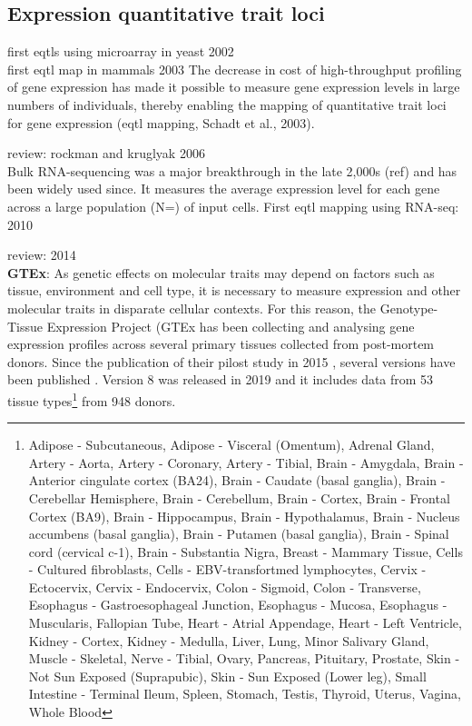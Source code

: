 \newpage

\subsection{Expression quantitative trait loci}\label{sec:eqtl}

first \glspl{eqtl} using microarray in yeast 2002 \cite{brem2002genetic}\\

first \gls{eqtl} map in mammals 2003
The decrease in cost of high-throughput profiling of gene expression has made it possible to measure gene expression levels in large numbers of individuals, thereby enabling the mapping of quantitative trait loci for gene expression (\gls{eqtl} mapping, Schadt et al., 2003). \cite{schadt2003genetics}

review: rockman and kruglyak 2006 \cite{rockman2006genetics}\\

Bulk RNA-sequencing was a major breakthrough in the late 2,000s (ref) and has been widely used since.
It measures the average expression level for each gene across a large population (N=) of input cells. 
First \gls{eqtl} mapping using RNA-seq: 2010
\cite{montgomery2010transcriptome, pickrell2010understanding}

review: 2014 \cite{westra2014genome}\\

\textbf{GTEx}:
As genetic effects on molecular traits may depend on factors such as tissue, environment and cell type, it is necessary to measure expression and other molecular traits in disparate cellular contexts. 
For this reason, the Genotype-Tissue Expression Project (GTEx has been collecting and analysing gene expression profiles across several primary tissues collected from post-mortem donors.
Since the publication of their pilost study in 2015 \cite{gtex2015genotype}, several versions have been published \cite{gtex2017genetic, aguet2019gtex}.
Version 8 was released in 2019 and it includes data from 53 tissue types\footnote{Adipose - Subcutaneous, Adipose - Visceral (Omentum), Adrenal Gland, Artery - Aorta, Artery - Coronary, Artery - Tibial, 
Brain - Amygdala, Brain - Anterior cingulate cortex (BA24), Brain - Caudate (basal ganglia), Brain - Cerebellar Hemisphere, Brain - Cerebellum, Brain - Cortex, Brain - Frontal Cortex (BA9), Brain - Hippocampus, Brain - Hypothalamus, Brain - Nucleus accumbens (basal ganglia), Brain - Putamen (basal ganglia), Brain - Spinal cord (cervical c-1), Brain - Substantia Nigra, 
Breast - Mammary Tissue, Cells - Cultured fibroblasts, Cells - EBV-transfortmed lymphocytes,  Cervix - Ectocervix, Cervix - Endocervix, Colon - Sigmoid, Colon - Transverse, Esophagus - Gastroesophageal Junction, Esophagus - Mucosa, Esophagus - Muscularis, Fallopian Tube, Heart - Atrial Appendage, Heart - Left Ventricle, Kidney - Cortex, Kidney - Medulla, Liver, Lung,  Minor Salivary Gland, Muscle - Skeletal, Nerve - Tibial, Ovary, Pancreas, Pituitary, Prostate,  Skin - Not Sun Exposed (Suprapubic), Skin - Sun Exposed (Lower leg), Small Intestine - Terminal Ileum, Spleen, Stomach, Testis, Thyroid, Uterus, Vagina, Whole Blood} from 948 donors.

